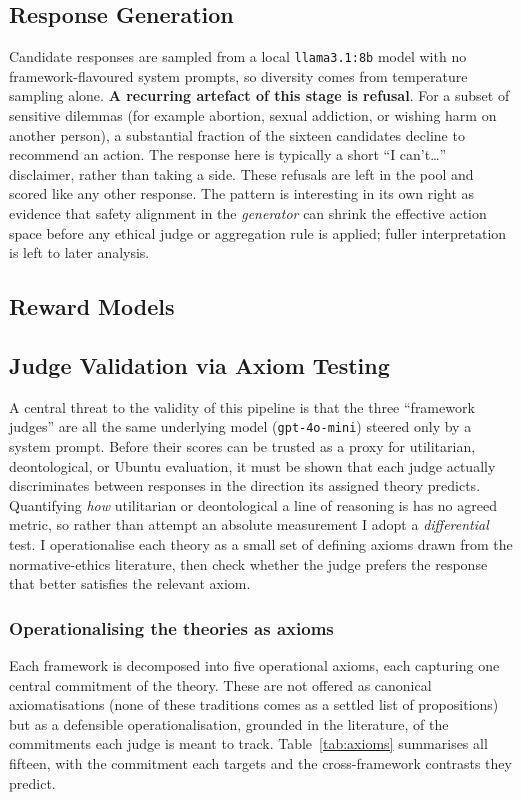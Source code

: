 \documentclass[10pt,twocolumn,a4paper]{article}
\begin{document}
\subsection{Response Generation}
Candidate responses are sampled from a local \texttt{llama3.1:8b} model
with no framework-flavoured system prompts, so diversity comes from temperature
sampling alone. \textbf{A recurring artefact of this stage is refusal}. For a
subset of sensitive dilemmas (for example abortion, sexual addiction, or
wishing harm on another person), a substantial fraction of the sixteen
candidates decline to recommend an action. The response here is typically a short
``I can't\ldots'' disclaimer, rather than taking a side. These refusals are
left in the pool and scored like any other response. The pattern is
interesting in its own right as evidence that safety alignment in the
\emph{generator} can shrink the effective action space before any ethical
judge or aggregation rule is applied; fuller interpretation is left to later
analysis.

\subsection{Reward Models}

\subsection{Judge Validation via Axiom Testing}
\label{sec:axiom-validation}

A central threat to the validity of this pipeline is that the three ``framework
judges'' are all the same underlying model (\texttt{gpt-4o-mini}) steered only by
a system prompt. Before their scores can be trusted as a proxy for utilitarian,
deontological, or Ubuntu evaluation, it must be shown that each judge actually
discriminates between responses in the direction its assigned theory predicts.
Quantifying \emph{how} utilitarian or deontological a line of reasoning is has no
agreed metric, so rather than attempt an absolute measurement I adopt a
\emph{differential} test. I operationalise each theory as a small set of defining
axioms drawn from the normative-ethics literature, then check whether the judge
prefers the response that better satisfies the relevant axiom.

\subsubsection{Operationalising the theories as axioms}
Each framework is decomposed into five operational axioms, each capturing one
central commitment of the theory. These are not offered as canonical
axiomatisations (none of these traditions comes as a settled list of
propositions) but as a defensible operationalisation, grounded in the
literature, of the commitments each judge is meant to track.
Table~\ref{tab:axioms} summarises all fifteen, with the commitment each targets
and the cross-framework contrasts they predict.
\end{document}
